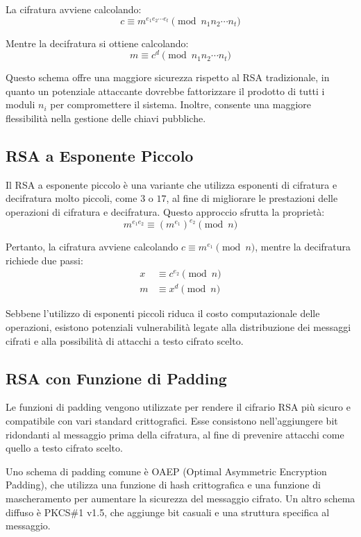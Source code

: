 \documentclass[a4paper,12pt]{report}
\begin{document}
La cifratura avviene calcolando:
\[c \equiv m^{e_1 e_2 \cdots e_t} \pmod{n_1 n_2 \cdots n_t}\]

Mentre la decifratura si ottiene calcolando:
\[m \equiv c^d \pmod{n_1 n_2 \cdots n_t}\]

Questo schema offre una maggiore sicurezza rispetto al RSA tradizionale, in quanto un potenziale attaccante dovrebbe fattorizzare il prodotto di tutti i moduli $n_i$ per compromettere il sistema. Inoltre, consente una maggiore flessibilità nella gestione delle chiavi pubbliche.

\subsection{RSA a Esponente Piccolo}
Il RSA a esponente piccolo è una variante che utilizza esponenti di cifratura e decifratura molto piccoli, come $3$ o $17$, al fine di migliorare le prestazioni delle operazioni di cifratura e decifratura. Questo approccio sfrutta la proprietà:
\[m^{e_1 e_2} \equiv (m^{e_1})^{e_2} \pmod{n}\]

Pertanto, la cifratura avviene calcolando $c \equiv m^{e_1} \pmod{n}$, mentre la decifratura richiede due passi:
\begin{align*}
x &\equiv c^{e_2} \pmod{n} \\
m &\equiv x^d \pmod{n}
\end{align*}

Sebbene l'utilizzo di esponenti piccoli riduca il costo computazionale delle operazioni, esistono potenziali vulnerabilità legate alla distribuzione dei messaggi cifrati e alla possibilità di attacchi a testo cifrato scelto.

\subsection{RSA con Funzione di Padding}
Le funzioni di padding vengono utilizzate per rendere il cifrario RSA più sicuro e compatibile con vari standard crittografici. Esse consistono nell'aggiungere bit ridondanti al messaggio prima della cifratura, al fine di prevenire attacchi come quello a testo cifrato scelto.

Uno schema di padding comune è OAEP (Optimal Asymmetric Encryption Padding), che utilizza una funzione di hash crittografica e una funzione di mascheramento per aumentare la sicurezza del messaggio cifrato. Un altro schema diffuso è PKCS\#1 v1.5, che aggiunge bit casuali e una struttura specifica al messaggio.
\end{document}
